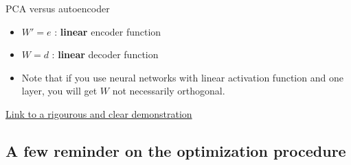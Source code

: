 \documentclass[compress,10pt]{beamer}
\begin{document}

\begin{frame}{PCA versus autoencoder}
\protect\hypertarget{pca-versus-autoencoder-1}{}
\begin{itemize}
\item
  \(W' = e\) : \textbf{linear} encoder function
\item
  \(W = d\) : \textbf{linear} decoder function
\item
  Note that if you use neural networks with linear activation function
  and one layer, you will get \(W\) not necessarily orthogonal.
\end{itemize}

\href{http://www.xavierdupre.fr/app/mlstatpy/helpsphinx/c_ml/rn/rn_9_auto.html}{Link
to a rigourous and clear demonstration}
\end{frame}


\subsection{A few reminder on the optimization procedure}
\end{document}
